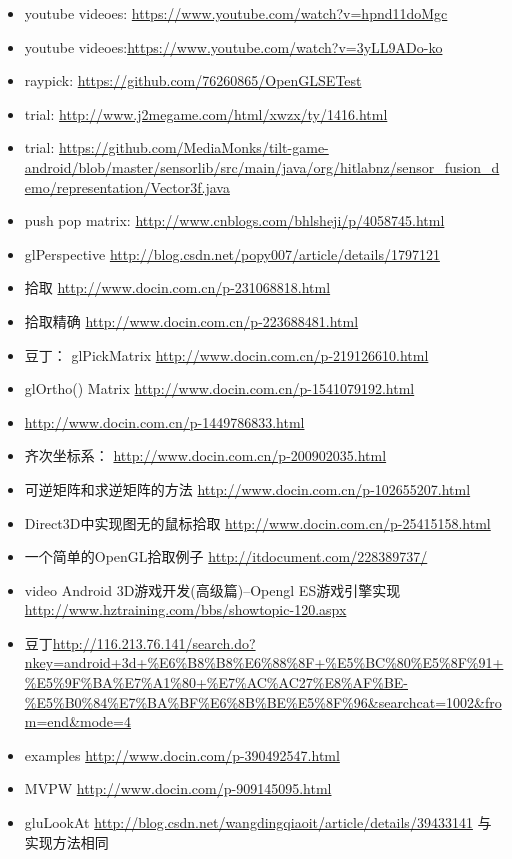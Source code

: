 \documentclass[9pt,b5paper]{article}
\begin{document}
\begin{itemize}
\item youtube videoes: \url{https://www.youtube.com/watch?v=hpnd11doMgc}
\item youtube videoes:\url{https://www.youtube.com/watch?v=3yLL9ADo-ko}
\item raypick: \url{https://github.com/76260865/OpenGLSETest}
\item trial: \url{http://www.j2megame.com/html/xwzx/ty/1416.html}
\item trial: \url{https://github.com/MediaMonks/tilt-game-android/blob/master/sensorlib/src/main/java/org/hitlabnz/sensor_fusion_demo/representation/Vector3f.java}
\item push pop matrix: \url{http://www.cnblogs.com/bhlsheji/p/4058745.html}
\item glPerspective \url{http://blog.csdn.net/popy007/article/details/1797121}
\item 拾取 \url{http://www.docin.com.cn/p-231068818.html}
\item 拾取精确 \url{http://www.docin.com.cn/p-223688481.html}
\item 豆丁： glPickMatrix \url{http://www.docin.com.cn/p-219126610.html}
\item glOrtho() Matrix \url{http://www.docin.com.cn/p-1541079192.html}
\item \url{http://www.docin.com.cn/p-1449786833.html}
\item 齐次坐标系： \url{http://www.docin.com.cn/p-200902035.html}
\item 可逆矩阵和求逆矩阵的方法 \url{http://www.docin.com.cn/p-102655207.html}
\item Direct3D中实现图无的鼠标拾取 \url{http://www.docin.com.cn/p-25415158.html}
\item 一个简单的OpenGL拾取例子 \url{http://itdocument.com/228389737/}
\item video Android 3D游戏开发(高级篇)--Opengl ES游戏引擎实现 \url{http://www.hztraining.com/bbs/showtopic-120.aspx}
\item 豆丁\url{http://116.213.76.141/search.do?nkey=android+3d+\%E6\%B8\%B8\%E6\%88\%8F+\%E5\%BC\%80\%E5\%8F\%91+\%E5\%9F\%BA\%E7\%A1\%80+\%E7\%AC\%AC27\%E8\%AF\%BE-\%E5\%B0\%84\%E7\%BA\%BF\%E6\%8B\%BE\%E5\%8F\%96&searchcat=1002&from=end&mode=4}
\item examples \url{http://www.docin.com/p-390492547.html}
\item MVPW \url{http://www.docin.com/p-909145095.html}
\item gluLookAt \url{http://blog.csdn.net/wangdingqiaoit/article/details/39433141} 与实现方法相同

\end{itemize}
\end{document}
